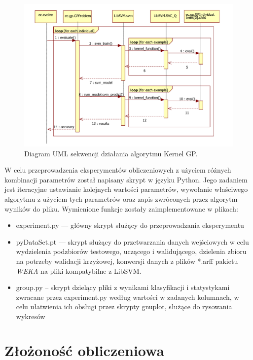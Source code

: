 \begin{figure}[h]
\centering
\includegraphics[scale=0.75]{figures/graphs/kernelgp}
\caption{Diagram UML sekwencji działania algorytmu Kernel GP.\label{fig:sequence}}
\end{figure}


W celu przeprowadzenia eksperymentów obliczeniowych z użyciem różnych kombinacji parametrów został napisany skrypt w języku Python. Jego zadaniem jest iteracyjne ustawianie kolejnych wartości parametrów, wywołanie właściwego algorytmu z użyciem tych parametrów oraz zapis zwróconych przez algorytm wyników do pliku. Wymienione funkcje zostały zaimplementowane w plikach:
\begin{itemize}
\item experiment.py --- główny skrypt służący do przeprowadzania eksperymentu
\item pyDataSet.pt --- skrypt służący do przetwarzania danych wejściowych w celu wydzielenia podzbiorów testowego, uczącego i walidującego, dzielenia zbioru na potrzeby walidacji krzyżowej, konwersji danych z plików *.arff pakietu \emph{WEKA} na pliki kompatybilne z LibSVM.
\item group.py -- skrypt dzielący pliki z wynikami klasyfikacji i statystykami zwracane przez experiment.py według wartości w zadanych kolumnach, w celu ułatwienia ich obsługi przez skrypty gnuplot, służące do rysowania wykresów 
\end{itemize}



\section{Złożoność obliczeniowa}
 \clearpage